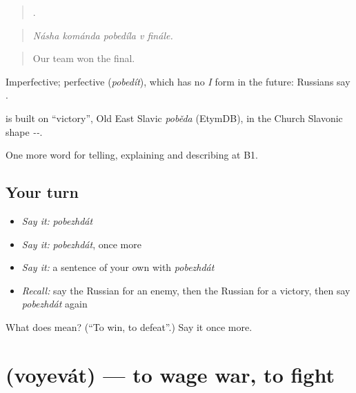 \begin{quote}
    .
\end{quote}

\begin{quote}
\emph{Násha kománda pobedíla v finále.}
\end{quote}

\begin{quote}
Our team won the final.
\end{quote}

Imperfective; perfective \emph{} (\emph{pobedít}), which has no \emph{I} form in the future: Russians say \emph{  }.

\begin{cousinweb}
\emph{} is built on \emph{} \textquotedblleft{}victory\textquotedblright{}, Old East Slavic \emph{poběda} (EtymDB), in the Church Slavonic shape \emph{--}.
\end{cousinweb}

\begin{grammarlens}[title={What you've built}]
One more word for telling, explaining and describing at B1.
\end{grammarlens}

\subsection*{Your turn}
\begin{itemize}
\raggedright
  \item \emph{Say it:} \emph{pobezhdát}
  \item \emph{Say it:} \emph{pobezhdát}, once more
  \item \emph{Say it:} a sentence of your own with \emph{pobezhdát}
  \item \emph{Recall:} say the Russian for an enemy, then the Russian for a victory, then say \emph{pobezhdát} again
\end{itemize}

\begin{tcolorbox}[breakable,colback=teal!4,colframe=teal!35!black,title={Before you move on}]
What does  mean? (\textquotedblleft{}To win, to defeat\textquotedblright{}.) Say it once more.
\end{tcolorbox}
\section[\texorpdfstring{\ru{воевать} (voyevát)}{воевать (voyevát)}]{ (voyevát) — to wage war, to fight}


